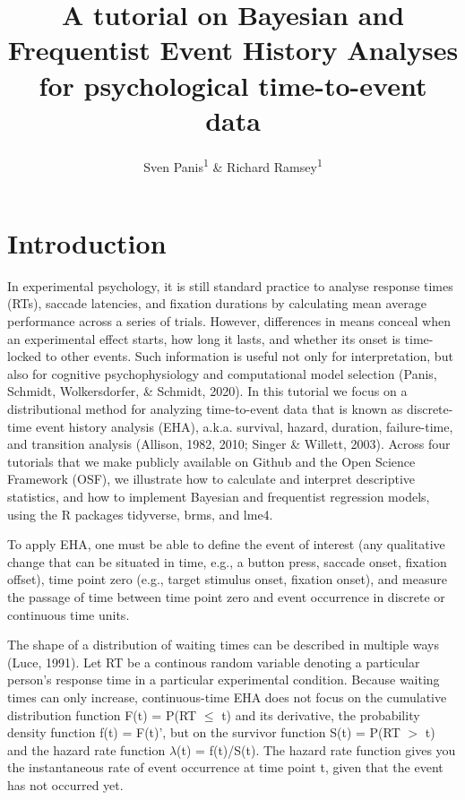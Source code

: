 \documentclass[
  man,floatsintext]{apa6}
\title{A tutorial on Bayesian and Frequentist Event History Analyses for psychological time-to-event data}
\author{Sven Panis\textsuperscript{1} \& Richard Ramsey\textsuperscript{1}}
\date{}
\affiliation{\vspace{0.5cm}\textsuperscript{1} ETH Zürich}
\begin{document}
\maketitle

\section{Introduction}\label{introduction}

In experimental psychology, it is still standard practice to analyse response times (RTs), saccade latencies, and fixation durations by calculating mean average performance across a series of trials. However, differences in means conceal when an experimental effect starts, how long it lasts, and whether its onset is time-locked to other events. Such information is useful not only for interpretation, but also for cognitive psychophysiology and computational model selection (Panis, Schmidt, Wolkersdorfer, \& Schmidt, 2020).
In this tutorial we focus on a distributional method for analyzing time-to-event data that is known as discrete-time event history analysis (EHA), a.k.a. survival, hazard, duration, failure-time, and transition analysis (Allison, 1982, 2010; Singer \& Willett, 2003). Across four tutorials that we make publicly available on Github and the Open Science Framework (OSF), we illustrate how to calculate and interpret descriptive statistics, and how to implement Bayesian and frequentist regression models, using the R packages tidyverse, brms, and lme4.

To apply EHA, one must be able to define the event of interest (any qualitative change that can be situated in time, e.g., a button press, saccade onset, fixation offset), time point zero (e.g., target stimulus onset, fixation onset), and measure the passage of time between time point zero and event occurrence in discrete or continuous time units.

The shape of a distribution of waiting times can be described in multiple ways (Luce, 1991). Let RT be a continous random variable denoting a particular person's response time in a particular experimental condition. Because waiting times can only increase, continuous-time EHA does not focus on the cumulative distribution function F(t) = P(RT \(\leq\) t) and its derivative, the probability density function f(t) = F(t)', but on the survivor function S(t) = P(RT \(>\) t) and the hazard rate function \(\lambda\)(t) = f(t)/S(t). The hazard rate function gives you the instantaneous rate of event occurrence at time point t, given that the event has not occurred yet.
\end{document}
